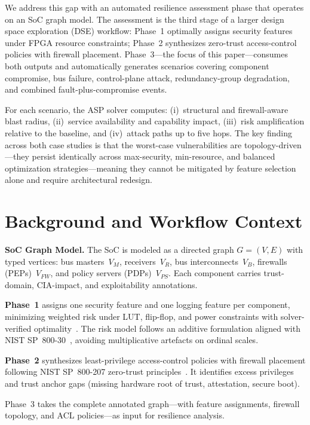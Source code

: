 \documentclass[conference]{IEEEtran}
\begin{document}
We address this gap with an automated resilience assessment phase that
operates on an SoC graph model. The assessment is the third stage of a
larger design space exploration (DSE) workflow: Phase~1 optimally assigns
security features under FPGA resource constraints; Phase~2 synthesizes
zero-trust access-control policies with firewall placement. Phase~3---the
focus of this paper---consumes both outputs and automatically generates
scenarios covering component compromise, bus failure, control-plane attack,
redundancy-group degradation, and combined fault-plus-compromise events.

For each scenario, the ASP solver computes: (i)~structural and
firewall-aware blast radius, (ii)~service availability and capability
impact, (iii)~risk amplification relative to the baseline, and
(iv)~attack paths up to five hops. The key finding across both case
studies is that the worst-case vulnerabilities are topology-driven---they
persist identically across max-security, min-resource, and balanced
optimization strategies---meaning they cannot be mitigated by feature
selection alone and require architectural redesign.

\section{Background and Workflow Context}

\textbf{SoC Graph Model.}
The SoC is modeled as a directed graph $G=(V,E)$ with typed vertices:
bus masters~$V_M$, receivers~$V_R$, bus interconnects~$V_B$, firewalls
(PEPs)~$V_{FW}$, and policy servers (PDPs)~$V_{PS}$. Each component
carries trust-domain, CIA-impact, and exploitability annotations.

\textbf{Phase~1} assigns one security feature and one logging feature per
component, minimizing weighted risk under LUT, flip-flop, and power
constraints with solver-verified optimality~\cite{gebser_asp}. The risk
model follows an additive formulation aligned with NIST
SP~800-30~\cite{nist_sp80030}, avoiding multiplicative artefacts on
ordinal scales.

\textbf{Phase~2} synthesizes least-privilege access-control policies with
firewall placement following NIST SP~800-207 zero-trust
principles~\cite{nist_zta}. It identifies excess privileges and trust
anchor gaps (missing hardware root of trust, attestation, secure boot).

Phase~3 takes the complete annotated graph---with feature assignments,
firewall topology, and ACL policies---as input for resilience analysis.
\end{document}
